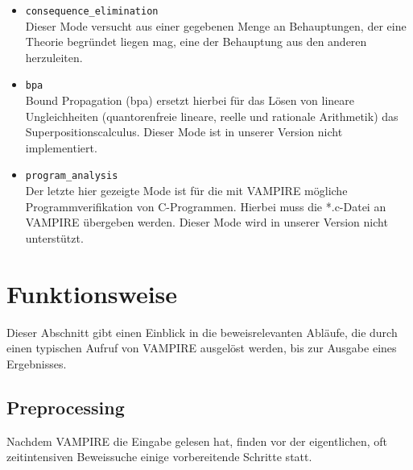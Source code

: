 \documentclass{article}
\begin{document}
\begin{itemize}
\begin{itemize}
	\item \verb|consequence_elimination| \\
	Dieser Mode versucht aus einer gegebenen Menge an Behauptungen, der eine Theorie begründet liegen mag, eine der Behauptung aus den anderen herzuleiten.
	\item \verb|bpa| \\
	Bound Propagation (bpa) ersetzt hierbei für das Lösen von lineare Ungleichheiten (quantorenfreie lineare, reelle und rationale Arithmetik) das Superpositionscalculus.
	Dieser Mode ist in unserer Version nicht implementiert.
	\item \verb|program_analysis| \\
	Der letzte hier gezeigte Mode ist für die mit VAMPIRE mögliche Programmverifikation von C-Programmen. Hierbei muss die *.c-Datei an VAMPIRE übergeben werden.
	Dieser Mode wird in unserer Version nicht unterstützt.
\end{itemize}

\end{itemize} %



\section{Funktionsweise}
\label{sec:mechanics}

Dieser Abschnitt gibt einen Einblick in die beweisrelevanten Abläufe, die durch einen typischen Aufruf von VAMPIRE ausgelöst werden, bis zur Ausgabe eines Ergebnisses.

\subsection{Preprocessing}
\label{subsec:preprocessing}

Nachdem VAMPIRE die Eingabe gelesen hat, finden vor der eigentlichen, oft zeitintensiven
Beweissuche einige vorbereitende Schritte statt.
\end{document}

